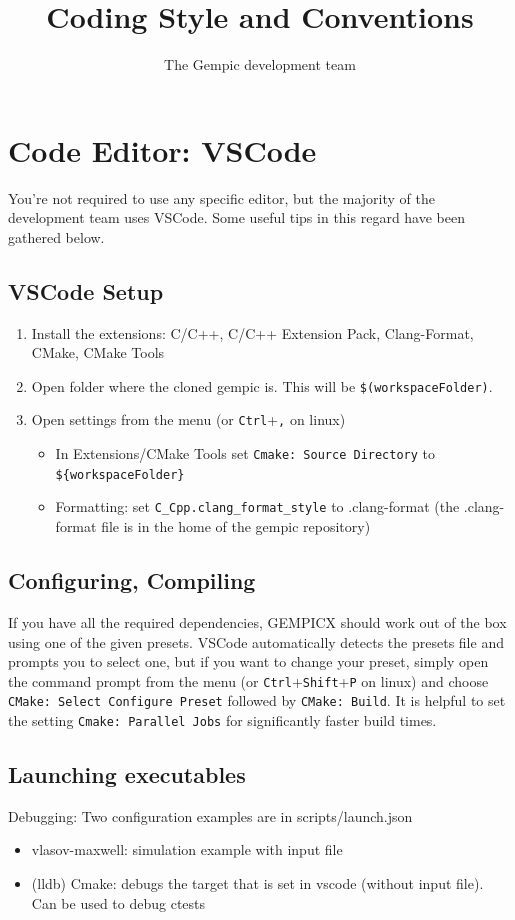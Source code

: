 \documentclass[11pt]{article}
\title{Coding Style and Conventions}
\author[1]{The Gempic development team}
\affil[1]{Max-Planck-Institut f\"ur Plasmaphysik, Garching, Germany}
\begin{document}
\maketitle

\tableofcontents

\section{Code Editor: VSCode}
You're not required to use any specific editor, but the majority of the development team uses VSCode. Some useful tips in this regard have been gathered below.

\subsection{VSCode Setup}
\begin{enumerate}
   \item Install the extensions: C/C++, C/C++ Extension Pack, Clang-Format, CMake, CMake Tools
   \item Open folder where the cloned gempic is. This will be \verb|$(workspaceFolder)|.
   \item Open settings from the menu (or \verb|Ctrl|+\verb|,| on linux)
   \begin{itemize}
      \item In Extensions/CMake Tools set \verb|Cmake: Source Directory| to \verb|${workspaceFolder}|
      \item Formatting: set \verb|C_Cpp.clang_format_style| to .clang-format (the .clang-format file is in the home of the gempic repository)
   \end{itemize}
\end{enumerate}

\subsection{Configuring, Compiling}
If you have all the required dependencies, GEMPICX should work out of the box using one of the given presets. VSCode automatically detects the presets file and prompts you to select one, but if you want to change your preset, simply open the command prompt from the menu (or \verb|Ctrl|+\verb|Shift|+\verb|P| on linux) and choose \verb|CMake: Select Configure Preset| followed by \verb|CMake: Build|. It is helpful to set the setting \verb|Cmake: Parallel Jobs| for significantly faster build times.

\subsection{Launching executables}
Debugging: Two configuration examples are in scripts/launch.json
\begin{itemize}
   \item vlasov-maxwell: simulation example with input file
   \item (lldb) Cmake: debugs the target that is set in vscode (without input file). Can be used to debug ctests
\end{itemize}
\end{document}
